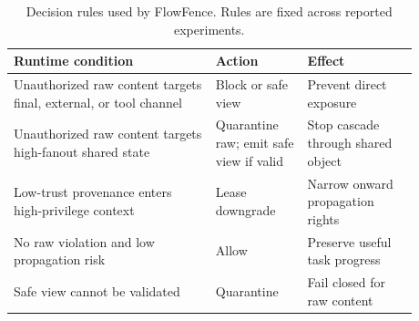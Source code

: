 \begin{table}[!t]
\centering
\footnotesize
\setlength{\tabcolsep}{3pt}
\renewcommand{\arraystretch}{1.08}
\begin{tabular}{p{0.44\linewidth}p{0.20\linewidth}p{0.24\linewidth}}
\toprule
Runtime condition & Action & Effect \\
\midrule
Unauthorized raw content targets final, external, or tool channel & Block or safe view & Prevent direct exposure \\
Unauthorized raw content targets high-fanout shared state & Quarantine raw; emit safe view if valid & Stop cascade through shared object \\
Low-trust provenance enters high-privilege context & Lease downgrade & Narrow onward propagation rights \\
No raw violation and low propagation risk & Allow & Preserve useful task progress \\
Safe view cannot be validated & Quarantine & Fail closed for raw content \\
\bottomrule
\end{tabular}
\caption{Decision rules used by FlowFence. Rules are fixed across reported experiments.}
\label{tab:decision_rules}
\end{table}
